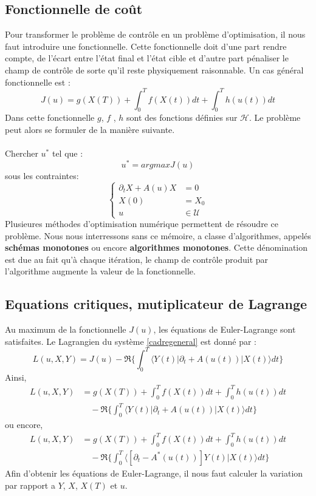 \subsection{Fonctionnelle de coût}
Pour transformer le problème de contrôle en un problème d’optimisation, il nous faut introduire une fonctionnelle. Cette fonctionnelle doit d’une part rendre compte, de l’écart entre l'état final et l'état cible et d’autre part pénaliser le champ de contrôle de sorte qu’il reste physiquement raisonnable. Un cas général fonctionnelle est :
\begin{equation}
J(u)=g(X(T))+\int_{0}^{T} f(X(t))dt+\int_{0}^{T} h(u(t))dt
\end{equation}
Dans cette fonctionnelle $g$, $f$ , $h$ sont des fonctions définies sur $\mathcal{H}$. Le problème peut alors se formuler de la manière suivante.\\\\
Chercher $u^*$ tel que :
\begin{equation*}
u^*=argmaxJ(u)
\end{equation*}
sous les contraintes:
\begin{equation*}
\begin{cases}
\partial_{t}X +A(u)X &= 0\\
X(0) &=X_0\\
u &\in \mathcal{U}
\end{cases}
\end{equation*}
Plusieures méthodes d'optimisation numérique permettent de résoudre ce problème. Nous nous interressons sans ce mémoire, a classe d’algorithmes, appelés \textbf{schémas monotones} ou encore \textbf{algorithmes monotones}. Cette dénomination est due au fait qu’à chaque itération, le champ de contrôle produit par l’algorithme augmente la valeur de la fonctionnelle.
\subsection{Equations critiques, mutiplicateur de Lagrange}
Au maximum de la fonctionnelle $J(u)$, les équations de Euler-Lagrange sont satisfaites. Le Lagrangien du système \eqref{cadregeneral} est donné par :
\begin{equation}
L(u,X,Y)= J(u) -\Re \bigg\{ \int_{0}^{T}\langle Y (t)|\partial_{t}+A(u(t))|X(t) \rangle dt \bigg\}
\end{equation}
Ainsi,
\begin{align*}
L(u,X,Y)&= g(X(T))+\int_{0}^{T} f(X(t))dt+\int_{0}^{T} h(u(t))dt\\
&\quad -\Re \bigg\{ \int_{0}^{T}\langle Y (t)|\partial_{t}+A(u(t))|X(t) \rangle dt \bigg\}
\end{align*}
ou encore,
\begin{align*}
L(u,X,Y)&= g(X(T))+\int_{0}^{T} f(X(t))dt+\int_{0}^{T} h(u(t))dt\\
&\quad -\Re \bigg\{ \int_{0}^{T}\langle [\partial_{t}-A^*(u(t))]Y (t)|X(t) \rangle dt \bigg\}
\end{align*}
Afin d'obtenir les équations de Euler-Lagrange, il nous faut calculer la variation par rapport a $Y$, $X$, $X(T)$ et $u$.
